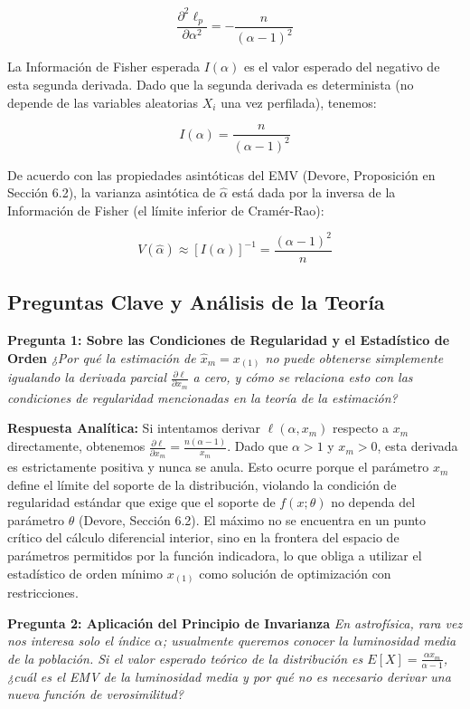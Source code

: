 $$ \frac{\partial^2 \ell_p}{\partial \alpha^2} = -\frac{n}{(\alpha - 1)^2} $$

La Información de Fisher esperada $I(\alpha)$ es el valor esperado del negativo de esta segunda derivada. Dado que la segunda derivada es determinista (no depende de las variables aleatorias $X_i$ una vez perfilada), tenemos:

$$ I(\alpha) = \frac{n}{(\alpha - 1)^2} $$

De acuerdo con las propiedades asintóticas del EMV (Devore, Proposición en Sección 6.2), la varianza asintótica de $\hat{\alpha}$ está dada por la inversa de la Información de Fisher (el límite inferior de Cramér-Rao):

$$ V(\hat{\alpha}) \approx [I(\alpha)]^{-1} = \frac{(\alpha - 1)^2}{n} $$

\subsection*{Preguntas Clave y Análisis de la Teoría}

\textbf{Pregunta 1: Sobre las Condiciones de Regularidad y el Estadístico de Orden}
\textit{¿Por qué la estimación de $\hat{x}_m = x_{(1)}$ no puede obtenerse simplemente igualando la derivada parcial $\frac{\partial \ell}{\partial x_m}$ a cero, y cómo se relaciona esto con las condiciones de regularidad mencionadas en la teoría de la estimación?}

\textbf{Respuesta Analítica:}
Si intentamos derivar $\ell(\alpha, x_m)$ respecto a $x_m$ directamente, obtenemos $\frac{\partial \ell}{\partial x_m} = \frac{n(\alpha - 1)}{x_m}$. Dado que $\alpha > 1$ y $x_m > 0$, esta derivada es estrictamente positiva y nunca se anula. Esto ocurre porque el parámetro $x_m$ define el límite del soporte de la distribución, violando la condición de regularidad estándar que exige que el soporte de $f(x; \theta)$ no dependa del parámetro $\theta$ (Devore, Sección 6.2). El máximo no se encuentra en un punto crítico del cálculo diferencial interior, sino en la frontera del espacio de parámetros permitidos por la función indicadora, lo que obliga a utilizar el estadístico de orden mínimo $x_{(1)}$ como solución de optimización con restricciones.

\textbf{Pregunta 2: Aplicación del Principio de Invarianza}
\textit{En astrofísica, rara vez nos interesa solo el índice $\alpha$; usualmente queremos conocer la luminosidad media de la población. Si el valor esperado teórico de la distribución es $E[X] = \frac{\alpha x_m}{\alpha - 1}$, ¿cuál es el EMV de la luminosidad media y por qué no es necesario derivar una nueva función de verosimilitud?}


